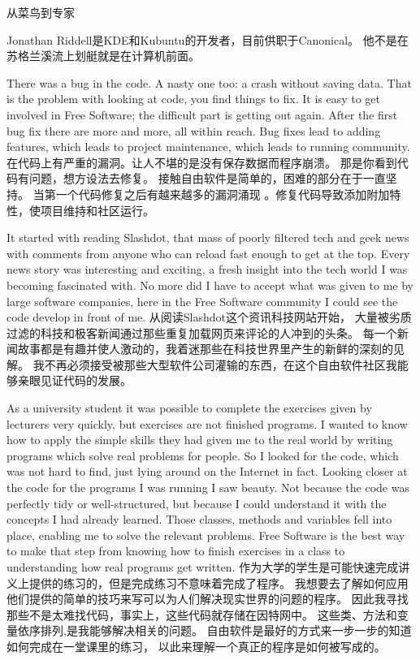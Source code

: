 从菜鸟到专家

Jonathan Riddell是KDE和Kubuntu的开发者，目前供职于Canonical。
他不是在苏格兰溪流上划艇就是在计算机前面。

\noindent{}There was a bug in the code. A nasty one too: a crash without saving data.
That is the problem with looking at code, you find things to fix. It is easy to get
involved in Free Software; the difficult part is getting out again. After the
first bug fix there are more and more, all within reach. Bug fixes lead to
adding features, which leads to project maintenance, which leads to running
community. 
在代码上有严重的漏洞。让人不堪的是没有保存数据而程序崩溃。
那是你看到代码有问题，想方设法去修复。
接触自由软件是简单的，困难的部分在于一直坚持。
当第一个代码修复之后有越来越多的漏洞涌现
。修复代码导致添加附加特性，使项目维持和社区运行。

It started with reading Slashdot, that mass of poorly filtered tech and geek
news with comments from anyone who can reload fast enough to get at the top.
Every news story was interesting and exciting, a fresh insight into the tech
world I was becoming fascinated with. No more did I have to accept what was
given to me by large software companies, here in the Free Software community I
could see the code develop in front of me.
从阅读Slashdot这个资讯科技网站开始，
大量被劣质过滤的科技和极客新闻通过那些重复加载网页来评论的人冲到的头条。
每一个新闻故事都是有趣并使人激动的，我着迷那些在科技世界里产生的新鲜的深刻的见解。
我不再必须接受被那些大型软件公司灌输的东西，在这个自由软件社区我能够亲眼见证代码的发展。

As a university student it was possible to complete the exercises given by
lecturers very quickly, but exercises are not finished programs. I wanted to
know how to apply the simple skills they had given me to the real world by
writing programs which solve real problems for people. So I looked for the code,
which was not hard to find, just lying around on the Internet in fact. 
Looking closer at the code for the programs I was running I saw beauty. Not
because the code was perfectly tidy or well-structured, but because I could
understand it with the concepts I had already learned. Those classes, methods
and variables fell into place, enabling me to solve the relevant problems. Free
Software is the best way to make that step from knowing how to finish exercises
in a class to understanding how real programs get written.
作为大学的学生是可能快速完成讲义上提供的练习的，但是完成练习不意味着完成了程序。
我想要去了解如何应用他们提供的简单的技巧来写可以为人们解决现实世界的问题的程序。
因此我寻找那些不是太难找代码，事实上，这些代码就存储在因特网中。
这些类、方法和变量依序排列,是我能够解决相关的问题。
自由软件是最好的方式来一步一步的知道如何完成在一堂课里的练习，
以此来理解一个真正的程序是如何被写成的。

